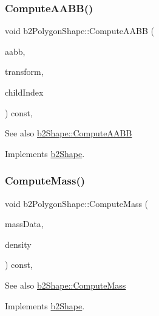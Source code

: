 \subsubsection{\texorpdfstring{Compute\+A\+A\+B\+B()}{ComputeAABB()}}
{\footnotesize\ttfamily void b2\+Polygon\+Shape\+::\+Compute\+A\+A\+BB (\begin{DoxyParamCaption}\item[{\hyperlink{structb2_a_a_b_b}{b2\+A\+A\+BB} $\ast$}]{aabb,  }\item[{const \hyperlink{structb2_transform}{b2\+Transform} \&}]{transform,  }\item[{int32}]{child\+Index }\end{DoxyParamCaption}) const\hspace{0.3cm}{\ttfamily [override]}, {\ttfamily [virtual]}}

\begin{DoxySeeAlso}{See also}
\hyperlink{classb2_shape_a88e9807fab0c8ca9a98d8926e50a1411}{b2\+Shape\+::\+Compute\+A\+A\+BB} 
\end{DoxySeeAlso}


Implements \hyperlink{classb2_shape_a88e9807fab0c8ca9a98d8926e50a1411}{b2\+Shape}.

\mbox{\label{classb2_polygon_shape_a908db2a51fc79fd49d6fe06be2cd8474}} 
\subsubsection{\texorpdfstring{Compute\+Mass()}{ComputeMass()}}
{\footnotesize\ttfamily void b2\+Polygon\+Shape\+::\+Compute\+Mass (\begin{DoxyParamCaption}\item[{\hyperlink{structb2_mass_data}{b2\+Mass\+Data} $\ast$}]{mass\+Data,  }\item[{float32}]{density }\end{DoxyParamCaption}) const\hspace{0.3cm}{\ttfamily [override]}, {\ttfamily [virtual]}}

\begin{DoxySeeAlso}{See also}
\hyperlink{classb2_shape_a61b365526241b47f124789b0309cac69}{b2\+Shape\+::\+Compute\+Mass} 
\end{DoxySeeAlso}


Implements \hyperlink{classb2_shape_a61b365526241b47f124789b0309cac69}{b2\+Shape}.


